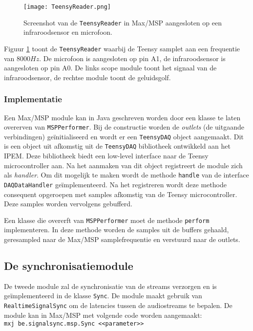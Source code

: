 \begin{figure}[h!]
	\captionsetup{width=0.8\textwidth}
	\caption{Screenshot van de \texttt{TeensyReader} in Max/MSP aangesloten op een infraroodsensor en microfoon.}
	\begin{center}
		\advance\parskip0.3cm
		\texttt{[image: TeensyReader.png]}
	\end{center}
	\label{teensyReader}
\end{figure}

Figuur \ref{teensyReader} toont de \texttt{TeensyReader} waarbij de Teensy samplet aan een frequentie van $8000Hz$. De microfoon is aangesloten op pin A1, de infraroodsensor is aangesloten op pin A0. De links scope module toont het signaal van de infraroodsensor, de rechtse module toont de geluidsgolf.

\subsubsection{Implementatie}

Een Max/MSP module kan in Java geschreven worden door een klasse te laten overerven van \texttt{MSPPerformer}. Bij de constructie worden de \textit{outlets} (de uitgaande verbindingen) geïnitialiseerd en wordt er een \texttt{TeensyDAQ} object aangemaakt. Dit is een object uit afkomstig uit de \texttt{TeensyDAQ} bibliotheek ontwikkeld aan het IPEM. Deze bibliotheek biedt een low-level interface naar de Teensy microcontroller aan. Na het aanmaken van dit object registreert de module zich als \textit{handler}. Om dit mogelijk te maken wordt de methode \texttt{handle} van de interface \texttt{DAQDataHandler} geïmplementeerd. Na het registreren wordt deze methode consequent opgeroepen met samples afkomstig van de Teensy microcontroller. Deze samples worden vervolgens gebufferd.

Een klasse die overerft van \texttt{MSPPerformer} moet de methode \texttt{perform} implementeren. In deze methode worden de samples uit de buffers gehaald, geresampled naar de Max/MSP samplefrequentie en verstuurd naar de outlets.

\subsection{De synchronisatiemodule}
\label{sync-module}

De tweede module zal de synchronisatie van de streams verzorgen en is geïmplementeerd in de klasse \texttt{Sync}. De module maakt gebruik van \texttt{RealtimeSignalSync} om de latencies tussen de audiostreams te bepalen. De module kan in Max/MSP met volgende code worden aangemaakt: \texttt{mxj\textapprox\  be.signalsync.msp.Sync <<parameter>>}

